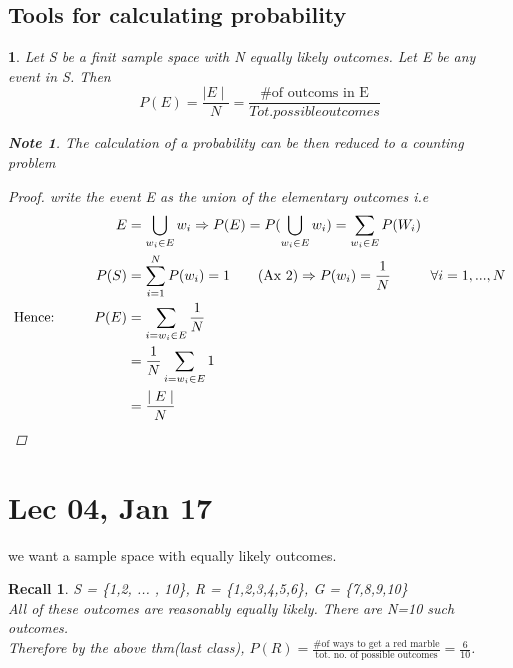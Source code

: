 \documentclass[11pt]{article}
\newtheorem{theorem}{\framebox{Thm}}[section]
\newtheorem*{note}{Note}
\newtheorem*{recall}{Recall}
\newcommand\tab[1][1cm]{\hspace*{#1}}
\begin{document}
        \subsection{Tools for calculating probability}
            \begin{theorem}
                Let S be a finit sample space with N equally likely outcomes. Let E be any event in S. 
                Then $$P(E) = \frac{\mid E \mid }{N} = \frac{\text{\# of outcoms in E}}{Tot. possible outcomes}$$
                \begin{note}
                    The calculation of a probability can be then reduced to a counting problem
                \end{note}
            
            
                \begin{proof}
                    write the event E as the union of the elementary outcomes i.e 
                    \begin{align*}
                        E       &= \bigcup_{w_i \in E} w_i \Rightarrow P(E) = P(\bigcup_{w_i \in E}w_i) = \sum_{w_i\in E} P(W_i)\\
                        P(S)    &= \sum_{i=1}^N P(w_i) = 1 \tag{Ax 2} \Rightarrow P(w_i) = \frac{1}{N} \tab \forall i = 1,...,N \\
                        \text{Hence:\tab} P(E) &= \sum_{i=w_i\in E} \frac{1}{N} \\
                                                &=\frac{1}{N} \sum_{i=w_i\in E} 1 \\
                                                &=\frac{\mid E\mid}{N}
                    \end{align*}
                \end{proof}
            \end{theorem}
        \newpage   
    \section{Lec 04, Jan 17}
        we want a sample space with equally likely outcomes. 
           \begin{recall}
               S = \{1,2, ... , 10\},\tab
               R = \{1,2,3,4,5,6\}, \tab
               G = \{7,8,9,10\}
               \\All of these outcomes are reasonably equally likely. There are N=10 such outcomes.
               \\Therefore by the above thm(last class), $P(R) = \frac{\text{\# of ways to get a red marble}}{\text{tot. no. of possible outcomes}} = \frac{6}{10}$.
           \end{recall}
           
\end{document}
